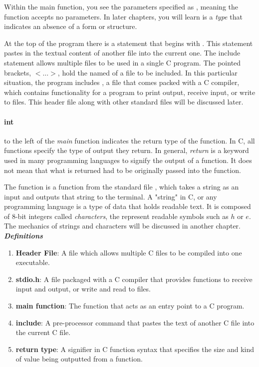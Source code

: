 Within the main function, you see the parameters specified as , meaning the function accepts no parameters. In later chapters, you will learn  is a \textit{type} that indicates an absence of a form or structure.

\par At the top of the program there is a statement that begins with . This statement pastes in the textual content of another file into the current one. The include statement allows multiple files to be used in a single C program. The pointed brackets, $<\dots>$, hold the named of a file to be included. In this particular situation, the program includes , a file that comes packed with a C compiler, which contains functionality for a program to print output, receive input, or write to files. This header file along with other standard files will be discussed later. 

\paragraph{int} to the left of the \emph{main} function indicates the return type of the function. In C, all functions specify the type of output they return. In general, \emph{return} is a keyword used in many programming languages to signify the output of a function. It does not mean that what is returned had to be originally passed into the function.

\par The  function is a function from the standard file , which takes a string as an input and outputs that string to the terminal. A "string" in C, or any programming language is a type of data that holds readable text. It is composed of 8-bit integers called \textit{characters}, the represent readable symbols such as $h$ or $e$. The mechanics of strings and characters will be discussed in another chapter. \\

\emph{\textbf{Definitions}}
\begin{enumerate}
\item \textbf{Header File}: A file which allows multiple C files to be compiled into one executable.
\item \textbf{stdio.h}: A file packaged with a C compiler that provides functions to receive input and output, or write and read to files.
\item \textbf{main function}: The function that acts as an entry point to a C program.
\item \textbf{include}: A pre-processor command that pastes the text of another C file into the current C file.
\item \textbf{return type}: A signifier in C function syntax that specifies the size and kind of value being outputted from a function.
\end{enumerate}